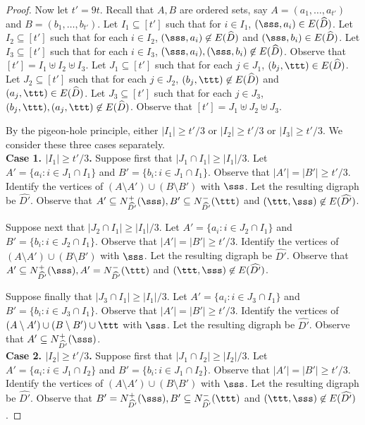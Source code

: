 \begin{proof}
Now let $t' = 9t$.
Recall that $A,B$ are ordered sets, say $A=(a_1, \ldots, a_{t'})$ and $B=(b_1, \ldots, b_{t'})$.
Let $I_1 \subseteq [t']$ such that for $i \in I_1$, $(\sss,a_i) \in E(\widehat{D})$. Let $I_2 \subseteq [t']$ such that for each $i \in I_2$, $(\sss,a_i) \not \in  E(\widehat{D})$ and $(\sss,b_i) \in E(\widehat{D})$. Let $I_3 \subseteq [t']$ such that for each $i \in I_3$, $(\sss,a_i), (\sss,b_i) \not \in E(\widehat{D})$. Observe that $[t']=I_1 \uplus I_2 \uplus I_3$. 
Let $J_1 \subseteq [t']$ such that for each $j \in J_1$, $(b_j,\ttt) \in E(\widehat{D})$. Let $J_2 \subseteq [t']$ such that for each $j \in J_2$, $(b_j , \ttt) \not \in E(\widehat{D})$ and $(a_j,\ttt) \in E(\widehat{D})$. Let $J_3 \subseteq [t']$ such that for each $j \in J_3$, $(b_j , \ttt), (a_j,\ttt) \not \in E(\widehat{D})$. Observe that $[t'] = J_1 \uplus J_2 \uplus J_3$.

By the pigeon-hole principle, either $|I_1| \geq t'/3$ or $|I_2| \geq t'/3$ or $|I_3| \geq t'/3$. We consider these three cases separately.\\

\noindent
{\bf Case 1. $|I_1| \geq t'/3$.} Suppose first that $|J_1 \cap I_1| \geq |I_1|/3$. Let $A' =\{a_i: i \in J_1 \cap I_1\}$ and $B' =\{b_i: i \in J_1 \cap I_1\}$. Observe that $|A'|=|B'| \geq t'/3$. Identify the vertices of $(A\setminus A') \cup (B \setminus B')$ with $\sss$. Let the resulting digraph be  $\widehat{D'}$. Observe that $A' \subseteq N^+_{\widehat{D'}}(\sss), B' \subseteq N^-_{\widehat{D'}}(\ttt)$ and $(\ttt, \sss) \not \in E(\widehat{D'})$.

Suppose next that $|J_2 \cap I_1| \geq |I_1|/3$. Let $A' =\{a_i:  i \in J_2 \cap I_1\}$ and $B' =\{b_i:  i \in J_2 \cap I_1\}$. Observe that $|A'|=|B'| \geq t'/3$. Identify the vertices of $(A\setminus A') \cup (B \setminus B')$ with $\sss$. Let the resulting digraph be  $\widehat{D'}$. Observe that $A' \subseteq N^+_{\widehat{D'}}(\sss), A' = N^-_{\widehat{D'}}(\ttt)$ and $(\ttt,\sss) \not \in E(\widehat{D'})$.

Suppose finally that $|J_3 \cap I_1| \geq |I_1|/3$. Let $A' =\{a_i:  i \in J_3 \cap I_1\}$ and $B' =\{b_i:  i \in J_3 \cap I_1\}$. Observe that $|A'|=|B'| \geq t'/3$.  Identify the vertices of $(A\setminus A') \cup (B \setminus B') \cup \ttt$ with $\sss$. Let the resulting digraph be  $\widehat{D'}$. Observe that $A' \subseteq N^+_{\widehat{D'}}(\sss)$.\\

\noindent
{\bf Case 2. $|I_2| \geq t'/3$.} Suppose first that $|J_1 \cap I_2| \geq |I_2|/3$. Let $A' =\{a_i:  i \in J_1 \cap I_2\}$ and $B' =\{b_i: i \in J_1 \cap I_2\}$. Observe that $|A'|=|B'| \geq t'/3$.
Identify the vertices of $(A\setminus A') \cup (B \setminus B')$ with $\sss$. Let the resulting digraph be  $\widehat{D'}$. Observe that $B' = N^+_{\widehat{D'}}(\sss), B' \subseteq N^-_{\widehat{D'}}(\ttt)$ and $(\ttt,\sss) \not \in E(\widehat{D'})$.


\end{proof}
